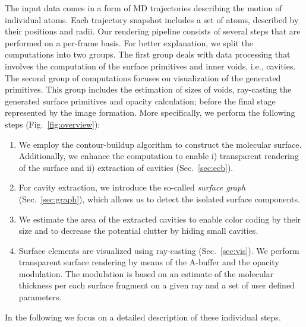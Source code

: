 The input data comes in a form of MD trajectories describing the motion of individual atoms. 
Each trajectory snapshot includes a set of atoms, described by their positions and radii. 
Our rendering pipeline consists of several steps that are performed on a per-frame basis. 
For better explanation, we split the computations into two groups. 
The first group deals with data processing that involves the computation of the surface primitives and inner voids, i.e., cavities.
The second group of computations focuses on visualization of the generated primitives. 
This group includes the estimation of sizes of voids, ray-casting the generated surface primitives and opacity calculation; before the final stage represented by the image formation. More specifically, we perform the following steps (Fig.~\ref{fig:overview}):
	\begin{enumerate}
	  \item We employ the contour-buildup algorithm to construct the molecular surface. Additionally, we enhance the computation to enable i) transparent rendering of the surface and ii) extraction of cavities (Sec.~\ref{sec:ecb}).
		\item For cavity extraction, we introduce the so-called \textit{surface graph} (Sec.~\ref{sec:graph}), which allows us to detect the isolated surface components.
		\item We estimate the area of the extracted cavities to enable color coding by their size and to decrease the potential clutter by hiding small cavities.
		\item Surface elements are visualized using ray-casting (Sec.~\ref{sec:vis}). We perform transparent surface rendering by means of the A-buffer and the opacity modulation. The modulation is based on an estimate of the molecular thickness per each surface fragment on a given ray and a set of user defined parameters.
	\end{enumerate}
	
In the following we focus on a detailed description of these individual steps.